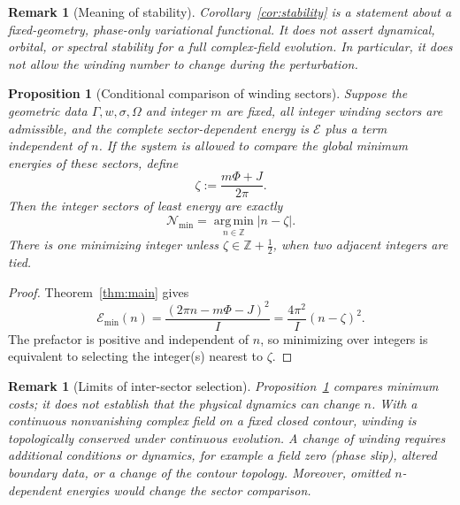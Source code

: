 \documentclass[11pt]{article}
\newtheorem{proposition}[theorem]{Proposition}
\newtheorem{remark}[theorem]{Remark}
\newcommand{\ZZ}{\mathbb{Z}}
\newcommand{\GG}{\Gamma}
\newcommand{\E}{\mathcal{E}}
\begin{document}
\begin{remark}[Meaning of stability]
Corollary~\ref{cor:stability} is a statement about a fixed-geometry,
phase-only variational functional.  It does not assert dynamical, orbital,
or spectral stability for a full complex-field evolution.  In particular,
it does not allow the winding number to change during the perturbation.
\end{remark}

\begin{proposition}[Conditional comparison of winding sectors]
\label{prop:sectors}
Suppose the geometric data $\GG,w,\sigma,\Omega$ and integer $m$ are fixed,
all integer winding sectors are admissible, and the complete
sector-dependent energy is $\E$ plus a term independent of $n$.
If the system is allowed to compare the global minimum energies of these
sectors, define
\begin{equation}
  \zeta:=\frac{m\Phi+J}{2\pi}.
\end{equation}
Then the integer sectors of least energy are exactly
\begin{equation}
  \boxed{\displaystyle
  \mathcal{N}_{\min}
    =\operatorname*{arg\,min}_{n\in\ZZ}|n-\zeta|.}
\end{equation}
There is one minimizing integer unless $\zeta\in\ZZ+\tfrac12$,
when two adjacent integers are tied.
\end{proposition}
\begin{proof}
Theorem~\ref{thm:main} gives
\begin{equation}
  \E_{\min}(n)
  =\frac{(2\pi n-m\Phi-J)^2}{I}
  =\frac{4\pi^2}{I}(n-\zeta)^2.
\end{equation}
The prefactor is positive and independent of $n$, so minimizing over
integers is equivalent to selecting the integer(s) nearest to $\zeta$.
\end{proof}

\begin{remark}[Limits of inter-sector selection]
Proposition~\ref{prop:sectors} compares minimum costs; it does not establish
that the physical dynamics can change $n$.  With a continuous nonvanishing
complex field on a fixed closed contour, winding is topologically conserved
under continuous evolution.  A change of winding requires additional
conditions or dynamics, for example a field zero (phase slip), altered
boundary data, or a change of the contour topology.  Moreover, omitted
$n$-dependent energies would change the sector comparison.
\end{remark}
\end{document}
